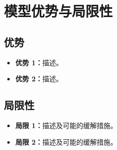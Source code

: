 
\section{模型优势与局限性}

\subsection{优势}
\begin{itemize}
    \item \textbf{优势 1：}描述。
    \item \textbf{优势 2：}描述。
\end{itemize}

\subsection{局限性}
\begin{itemize}
    \item \textbf{局限 1：}描述及可能的缓解措施。
    \item \textbf{局限 2：}描述及可能的缓解措施。
\end{itemize}
